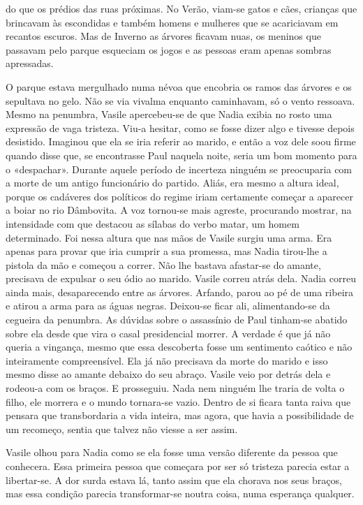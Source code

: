 do que os prédios das ruas próximas. No Verão, viam-se gatos e cães,
crianças que brincavam às escondidas e também homens e mulheres que se
acariciavam em recantos escuros. Mas de Inverno as árvores ficavam nuas,
os meninos que passavam pelo parque esqueciam os jogos e as pessoas eram apenas
sombras apressadas.

O parque estava mergulhado numa névoa que encobria os ramos das árvores
e os sepultava no gelo. Não se via vivalma enquanto caminhavam, só o
vento ressoava. Mesmo na penumbra, Vasile apercebeu-se de que Nadia
exibia no rosto uma expressão de vaga tristeza. Viu-a hesitar, como se
fosse dizer algo e tivesse depois desistido. Imaginou que ela se iria
referir ao marido, e então a voz dele soou firme quando disse que, se
encontrasse Paul naquela noite, seria um bom momento para o «despachar». Durante aquele período de incerteza ninguém se preocuparia com a
morte de um antigo funcionário do partido. Aliás, era mesmo a altura
ideal, porque os cadáveres dos políticos do regime iriam certamente
começar a aparecer a boiar no rio Dâmbovita. A voz tornou-se mais
agreste, procurando mostrar, na intensidade com que destacou as
sílabas do verbo matar, um homem determinado. Foi nessa altura que nas
mãos de Vasile surgiu uma arma. Era apenas para provar que iria cumprir
a sua promessa, mas Nadia tirou-lhe a pistola da mão e começou a
correr. Não lhe bastava afastar-se do amante, precisava de expulsar o
seu ódio ao marido. Vasile correu atrás dela. Nadia correu ainda mais,
desaparecendo entre as árvores. Arfando, parou ao pé de uma ribeira e
atirou a arma para as águas negras. Deixou-se ficar ali, alimentando-se
da cegueira da penumbra. As dúvidas sobre o assassínio de Paul tinham-se
abatido sobre ela desde que vira o casal presidencial morrer. A verdade
é que já não queria a vingança, mesmo que essa descoberta fosse um
sentimento
caótico e não inteiramente compreensível. Ela já não precisava da
morte do marido e isso mesmo disse ao amante debaixo do seu abraço.
Vasile veio por detrás dela e rodeou-a com os braços. E prosseguiu. Nada
nem ninguém lhe traria de volta o filho, ele morrera e o mundo tornara-se vazio. Dentro de si ficara tanta raiva que pensara que transbordaria
a vida inteira, mas agora, que havia a possibilidade de um recomeço,
sentia que talvez não viesse a ser assim.

Vasile olhou para Nadia como se ela fosse uma versão diferente da pessoa
que conhecera. Essa primeira pessoa que começara por ser só tristeza
parecia estar a libertar-se. A dor surda estava lá, tanto assim que ela
chorava nos seus braços, mas essa condição parecia transformar-se noutra
coisa, numa esperança qualquer.

